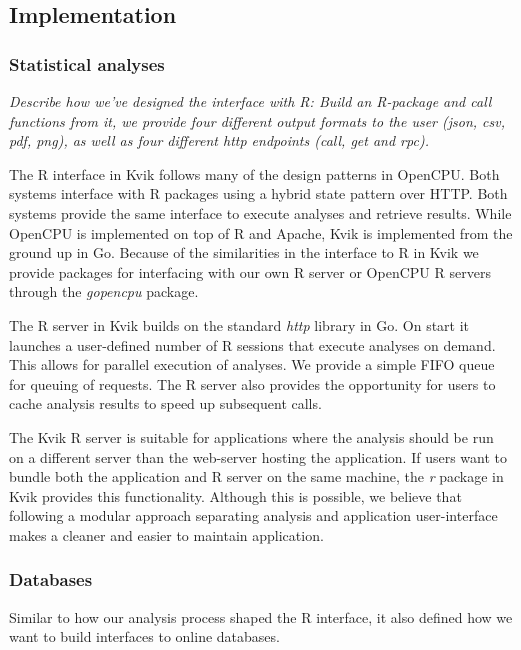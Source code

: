 \subsection*{Implementation}

\subsubsection*{Statistical analyses}
\emph{Describe how we've designed the interface with R: Build an R-package and
call functions from it, we provide four different output formats to the user
(json, csv, pdf, png),  as well as four different http endpoints (call, get and
rpc).}

The R interface in Kvik follows many of the design patterns in OpenCPU. Both
systems interface with R packages using a hybrid state pattern over HTTP. Both
systems provide the same interface to execute analyses and retrieve results.
While OpenCPU is implemented on top of R and Apache, Kvik is implemented from
the ground up in Go. Because of the similarities in the interface to R in Kvik
we provide packages for interfacing with our own R server or OpenCPU R servers
through the \emph{gopencpu} package. 

The R server in Kvik builds on the standard \emph{http} library in Go. On start
it launches a user-defined number of R sessions that execute analyses on demand.
This allows for parallel execution of analyses. We provide a simple FIFO queue
for queuing of requests. The R server also provides the opportunity for users to
cache analysis results to speed up subsequent calls. 

The Kvik R server is suitable for applications where the analysis should be run
on a different server than the web-server hosting the application. If users want
to bundle both the application and R server on the same machine, the \emph{r}
package in Kvik provides this functionality. Although this is possible, we
believe that following a modular approach separating analysis and
application user-interface makes a cleaner and easier to maintain application. 

\subsubsection*{Databases} 
Similar to how our analysis process shaped the R interface, it also defined how
we want to build interfaces to online databases. 

